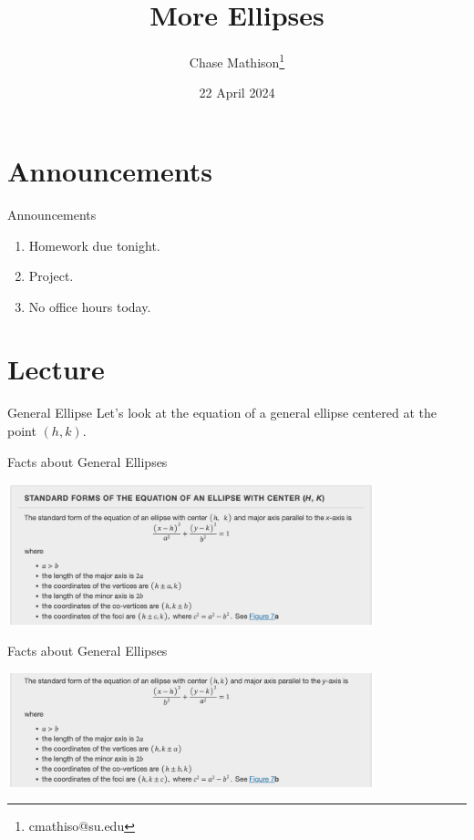 \documentclass[presentation]{beamer}
\institute[SU]{Shenandoah University}
\author{Chase Mathison\thanks{cmathiso@su.edu}}
\date{22 April 2024}
\title{More Ellipses}
\begin{document}
\maketitle

\section{Announcements}
\label{sec:orgda77369}
\begin{frame}[label={sec:orgfebf85e}]{Announcements}
\begin{enumerate}
\item Homework due tonight.
\item Project.
\item No office hours today.
\end{enumerate}
\end{frame}


\section{Lecture}
\label{sec:orgaecb6e8}
\begin{frame}[label={sec:org33886ff}]{General Ellipse}
Let's look at the equation of a general ellipse centered at the point \(\left( h,k \right)\).

\vspace{10in}
\end{frame}

\begin{frame}[label={sec:org57ae33b}]{Facts about General Ellipses}
\begin{center}
\includegraphics[width=0.8\textwidth]{./gel001.png}
\end{center}
\end{frame}

\begin{frame}[label={sec:org5c1042e}]{Facts about General Ellipses}
\begin{center}
\includegraphics[width=0.8\textwidth]{./gel002.png}
\end{center}
\end{frame}
\end{document}
